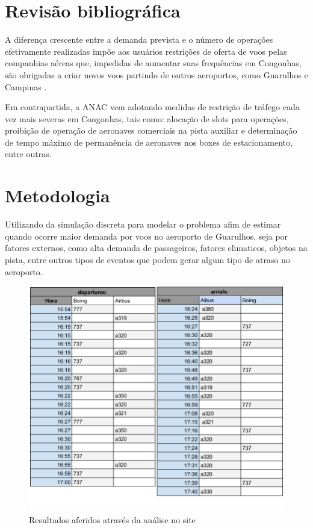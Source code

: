 \documentclass[12pt]{article}
\begin{document}
\section{Revisão bibliográfica} \label{sec:revisaobibliografica}

A diferença crescente entre a demanda prevista e o número de
operações efetivamente realizadas impõe aos usuários
restrições de oferta de voos pelas companhias aéreas que,
impedidas de aumentar suas frequências em Congonhas, são 
obrigadas a criar novos voos partindo de outros aeroportos,
como Guarulhos e Campinas \cite{boulic:91}.

Em contrapartida, a ANAC vem adotando medidas de restrição 
de tráfego cada vez mais severas em Congonhas, tais como: 
alocação de slots para operações, proibição de operação de 
aeronaves comerciais na pista auxiliar e determinação de tempo
máximo de permanência de aeronaves nos boxes de estacionamento,
entre outras\cite{Medau:09}. 







\section{Metodologia}

Utilizando da simulação discreta para modelar o problema afim de estimar
quando ocorre maior demanda por voos no aeroporto de Guarulhos, seja por
fatores externos, como alta demanda de passageiros, fatores climaticos,
objetos na pista, entre outros tipos de eventos que podem gerar algum 
tipo de atraso no aeroporto.


\begin{figure}[ht]
  \centering
  \includegraphics[width=.6\textwidth]{dados.png}
  \caption{Resultados aferidos através da análise no site}
  \label{fig:saida}
\end{figure}
\end{document}
